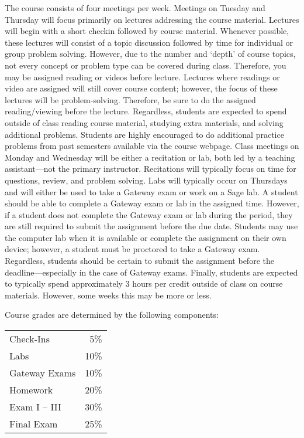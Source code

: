 \documentclass[11pt,letterpaper]{article}
\begin{document}

The course consists of four meetings per week. Meetings on Tuesday and Thursday will focus primarily on lectures addressing the course material. Lectures will begin with a short checkin followed by course material. Whenever possible, these lectures will consist of a topic discussion followed by time for individual or group problem solving. However, due to the number and `depth' of course topics, not every concept or problem type can be covered during class. Therefore, you may be assigned reading or videos before lecture. Lectures where readings or video are assigned will still cover course content; however, the focus of these lectures will be problem-solving. Therefore, be sure to do the assigned reading/viewing before the lecture. Regardless, students are expected to spend outside of class reading course material, studying extra materials, and solving additional problems. Students are highly encouraged to do additional practice problems from past semesters available via the course webpage. Class meetings on Monday and Wednesday will be either a recitation or lab, both led by a teaching assistant---not the primary instructor. Recitations will typically focus on time for questions, review, and problem solving. Labs will typically occur on Thursdays and will either be used to take a Gateway exam or work on a Sage lab. A student should be able to complete a Gateway exam or lab in the assigned time. However, if a student does not complete the Gateway exam or lab during the period, they are still required to submit the assignment before the due date. Students may use the computer lab when it is available or complete the assignment on their own device; however, a student must be proctored to take a Gateway exam. Regardless, students should be certain to submit the assignment before the deadline---especially in the case of Gateway exams. Finally, students are expected to typically spend approximately 3 hours per credit outside of class on
course materials. However, some weeks this may be more or less.
\sectionbreak






Course grades are determined by the following components: \par
	\begin{table}[!ht]
        \begin{tabular}{lr}
	Check-Ins & 5\% \\
	Labs & 10\% \\
	Gateway Exams& 10\% \\
	Homework & 20\% \\
	Exam I -- III & 30\% \\
	Final Exam & 25\%
        \end{tabular} 
        \end{table}
\pspace
\end{document}

